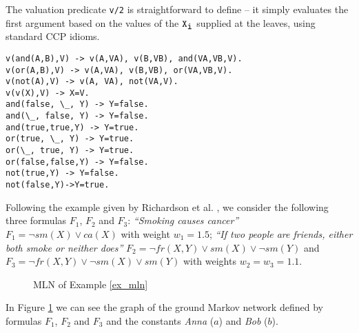 The valuation predicate {\tt v/2} is straightforward to define -- it simply evaluates the first argument based on the values of the \(\mbox{\tt X}_{\mbox{\tt i}}\) supplied at the leaves, using standard CCP idioms.
\begin{lstlisting}[mathescape=true]
v(and(A,B),V) -> v(A,VA), v(B,VB), and(VA,VB,V).
v(or(A,B),V) -> v(A,VA), v(B,VB), or(VA,VB,V).
v(not(A),V) -> v(A, VA), not(VA,V).
v(v(X),V) -> X=V.
and(false, \_, Y) -> Y=false.
and(\_, false, Y) -> Y=false.
and(true,true,Y) -> Y=true.
or(true, \_, Y) -> Y=true.
or(\_, true, Y) -> Y=true.
or(false,false,Y) -> Y=false.
not(true,Y) -> Y=false.
not(false,Y)->Y=true.
\end{lstlisting}

\begin{example}\label{ex_mln}
Following the example given by Richardson et al. \cite{markovLogicNetworks}, we consider the following three formulas $F_1$, $F_2$ and $F_3$: \emph{``Smoking causes cancer''} $F_1=\neg sm(X) \vee ca(X)$ with weight $w_1=1.5$; 
\emph{``If two people are friends, either both smoke or neither does''} $F_2 = \neg fr(X, Y) \vee sm(X) \vee \neg sm(Y)$ and $F_3= \neg fr(X, Y) \vee \neg sm(X) \vee sm(Y) $ with weights $w_2=w_3=1.1$.
\begin{figure}[h!]
\centering
{}
\caption{MLN of Example \ref{ex_mln}}
\label{mln}
\end{figure}
In Figure \ref{mln} we can see the graph of the ground Markov network defined by formulas $F_1$, $F_2$ and $F_3$ and the constants \emph{Anna} ($a$) and \emph{Bob} ($b$).



\end{example}
